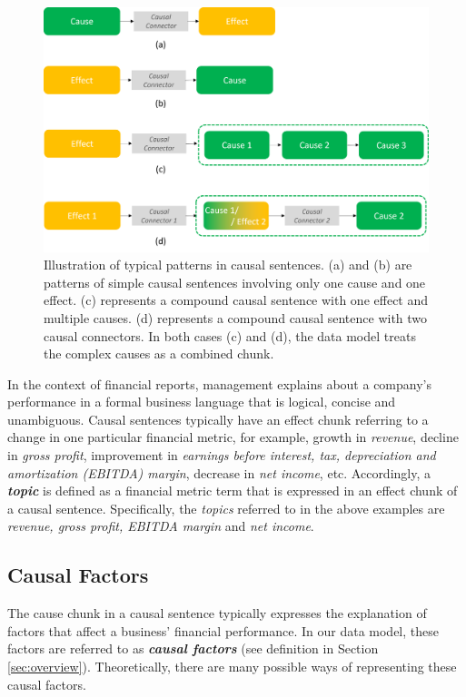 \documentclass [
     12pt,         %
     a4paper,      %
     BCOR10mm,     %
     DIV14,        %
     liststotoc,   %
     bibtotoc,     %
     idxtotoc,     %
     parskip       %
     ]{scrreprt}
\begin{document}
\begin{figure}[h!]
\centering
  \includegraphics[scale=0.5]{figures/CausalBlocks.png}
  \caption{Illustration of typical patterns in causal sentences. (a) and (b) are patterns of simple causal sentences involving only one cause and one effect. (c) represents a compound causal sentence with one effect and multiple causes. (d) represents a compound causal sentence with two causal connectors. In both cases (c) and (d), the data model treats the complex causes as a combined chunk.}
  \label{fig:blockpatterns}
\end{figure}



In the context of financial reports, management explains about a company's performance in a formal business language that is logical, concise and unambiguous. Causal sentences typically have an effect chunk referring to a change in one particular financial metric, for example, growth in \emph{revenue}, decline in \emph{gross profit}, improvement in \emph{earnings before interest, tax, depreciation and amortization (EBITDA) margin}, decrease in \emph{net income}, etc. Accordingly, a \emph{\textbf{topic}} is defined as a financial metric term that is expressed in an effect chunk of a causal sentence. Specifically, the \emph{topics} referred to in the above examples are \emph{revenue, gross profit, EBITDA margin} and \emph{net income}.


\subsection{Causal Factors}

The cause chunk in a causal sentence typically expresses the explanation of factors that affect a business' financial performance. In our data model, these factors are referred to as \emph{\textbf{causal factors}} (see definition in Section \ref{sec:overview}). Theoretically, there are many possible ways of representing these causal factors. 
\end{document}
